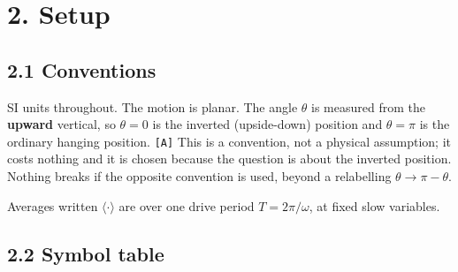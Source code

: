 \documentclass[11pt,a4paper]{article}
\providecommand{\passthrough}[1]{#1}
\begin{document}
\tableofcontents
\clearpage

\hypertarget{setup}{%
\section{2. Setup}\label{setup}}

\hypertarget{conventions}{%
\subsection{2.1 Conventions}\label{conventions}}

SI units throughout. The motion is planar. The angle \(\theta\) is measured from
the \textbf{upward} vertical, so \(\theta=0\) is the inverted (upside-down) position
and \(\theta=\pi\) is the ordinary hanging position. \passthrough{\lstinline![A]!} This is a convention,
not a physical assumption; it costs nothing and it is chosen because the
question is about the inverted position. Nothing breaks if the opposite
convention is used, beyond a relabelling \(\theta\to\pi-\theta\).

Averages written \(\langle\cdot\rangle\) are over one drive period
\(T=2\pi/\omega\), at fixed slow variables.

\hypertarget{symbol-table}{%
\subsection{2.2 Symbol table}\label{symbol-table}}
\end{document}
